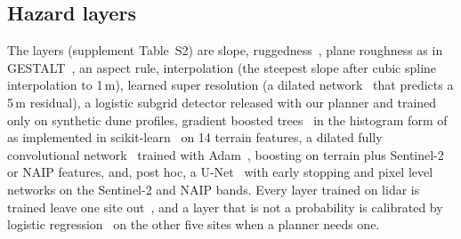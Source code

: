 \subsection{Hazard layers}
The layers (supplement Table~S2) are slope, ruggedness~\cite{riley1999}, plane roughness as in GESTALT~\cite{goldberg2002}, an aspect rule, interpolation (the steepest slope after cubic spline interpolation to 1\,m), learned super resolution (a dilated network~\cite{yu2016} that predicts a 5\,m residual), a logistic subgrid detector released with our planner and trained only on synthetic dune profiles, gradient boosted trees~\cite{friedman2001} in the histogram form of~\cite{ke2017} as implemented in scikit-learn~\cite{pedregosa2011} on 14 terrain features, a dilated fully convolutional network~\cite{long2015fully} trained with Adam~\cite{kingma2015adam}, boosting on terrain plus Sentinel-2 or NAIP features, and, post hoc, a U-Net~\cite{ronneberger2015unet} with early stopping and pixel level networks on the Sentinel-2 and NAIP bands. Every layer trained on lidar is trained leave one site out~\cite{roberts2017}, and a layer that is not a probability is calibrated by logistic regression~\cite{platt1999} on the other five sites when a planner needs one.

